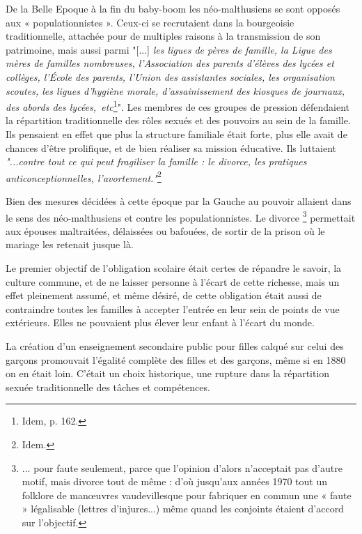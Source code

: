  De la Belle Epoque à la fin du baby-boom les néo-malthusiens se sont opposés aux « populationnistes ». Ceux-ci se recrutaient dans la bourgeoisie traditionnelle, attachée pour de multiples raisons à la transmission de son patrimoine, mais aussi parmi {"[...] \emph{les ligues de pères de famille, la Ligue des mères de familles nombreuses, l'Association des parents d'élèves des lycées et collèges, l'École des parents, l'Union des assistantes sociales, les organisation scoutes, les ligues d'hygiène morale, d'assainissement des kiosques de journaux, des abords des lycées,~etc}\footnote{Idem, p. 162.}".} Les membres de ces groupes de pression défendaient la répartition traditionnelle des rôles sexués et des pouvoirs au sein de la famille. Ils pensaient en effet que plus la structure familiale était forte, plus elle avait de chances d'être prolifique, et de bien réaliser sa mission éducative. Ils luttaient {\emph{"...contre tout ce qui peut fragiliser la famille : le divorce, les pratiques anticonceptionnelles, l'avortement."}\footnote{Idem.}}




 Bien des mesures décidées à cette époque par la Gauche au pouvoir allaient dans le sens des néo-malthusiens et contre les populationnistes. Le divorce%
\footnote{... pour faute seulement, parce que l'opinion d'alors n'acceptait pas d'autre motif, mais divorce tout de même : d'où jusqu'aux années 1970 tout un folklore de manœuvres vaudevillesque pour fabriquer en commun une « faute » légalisable (lettres d'injures...) même quand les conjoints étaient d'accord sur l'objectif.} 
permettait aux épouses maltraitées, délaissées ou bafouées, de sortir de la prison où le mariage les retenait jusque là. 

 Le premier objectif de l'obligation scolaire était certes de répandre le savoir, la culture commune, et de ne laisser personne à l'écart de cette richesse, mais un effet pleinement assumé, et même désiré, de cette obligation était aussi de contraindre toutes les familles à accepter l'entrée en leur sein de points de vue extérieurs. Elles ne pouvaient plus élever leur enfant à l'écart du monde. 

 La création d'un enseignement secondaire public pour filles calqué sur celui des garçons promouvait l'égalité complète des filles et des garçons, même si en 1880 on en était loin. C'était un choix historique, une rupture dans la répartition sexuée traditionnelle des tâches et compétences. 

